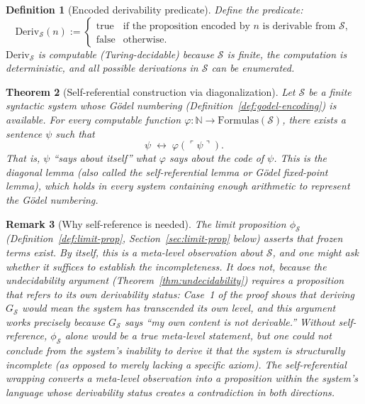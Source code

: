 \documentclass[11pt]{article}
\newtheorem{theorem}{Theorem}[section]
\newtheorem{definition}[theorem]{Definition}
\newtheorem{remark}[theorem]{Remark}
\begin{document}
\begin{definition}[Encoded derivability predicate]
\label{def:deriv-predicate}
Define the predicate:
\[
  \mathrm{Deriv}_{\mathcal{S}}(n) :=
  \begin{cases}
    \mathrm{true}
      & \text{if the proposition encoded by } n
        \text{ is derivable from } \mathcal{S}, \\
    \mathrm{false}
      & \text{otherwise.}
  \end{cases}
\]
$\mathrm{Deriv}_{\mathcal{S}}$ is computable (Turing-decidable) because
$\mathcal{S}$ is finite, the computation is deterministic, and all
possible derivations in $\mathcal{S}$ can be enumerated.
\end{definition}

\begin{theorem}[Self-referential construction via diagonalization]
\label{thm:kleene}
Let $\mathcal{S}$ be a finite syntactic system whose G\"odel numbering
(Definition~\ref{def:godel-encoding}) is available. For every computable
function $\varphi : \mathbb{N} \to \mathrm{Formulas}(\mathcal{S})$, there
exists a sentence $\psi$ such that
\[
  \psi \;\leftrightarrow\; \varphi(\ulcorner\psi\urcorner).
\]
That is, $\psi$ ``says about itself'' what $\varphi$ says about the code
of $\psi$. This is the diagonal lemma (also called the self-referential
lemma or G\"odel fixed-point lemma), which holds in every system
containing enough arithmetic to represent the G\"odel numbering.
\end{theorem}

\begin{remark}[Why self-reference is needed]
\label{rem:why-self-ref}
The limit proposition $\phi_{\mathcal{S}}$
(Definition~\ref{def:limit-prop}, Section~\ref{sec:limit-prop} below)
asserts that frozen terms exist. By itself, this is a meta-level
observation about $\mathcal{S}$, and one might ask whether it suffices to
establish the incompleteness. It does not, because the undecidability
argument (Theorem~\ref{thm:undecidability}) requires a proposition that
\emph{refers to its own derivability status}: Case~1 of the proof shows
that deriving $G_{\mathcal{S}}$ would mean the system has transcended its
own level, and this argument works precisely because $G_{\mathcal{S}}$
says ``my own content is not derivable.'' Without self-reference,
$\phi_{\mathcal{S}}$ alone would be a true meta-level statement, but one
could not conclude from the system's inability to derive it that the
system is \emph{structurally} incomplete (as opposed to merely lacking a
specific axiom). The self-referential wrapping converts a meta-level
observation into a proposition \emph{within the system's language} whose
derivability status creates a contradiction in both directions.
\end{remark}
\end{document}
